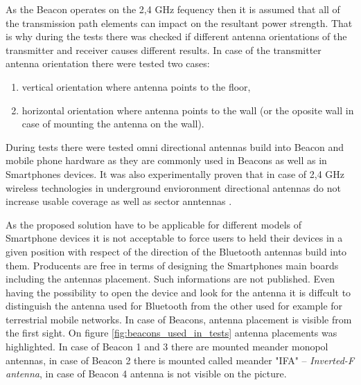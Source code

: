 \documentclass[../main.tex]{subfiles}
\begin{document}
As the Beacon operates on the 2,4 GHz fequency then it is assumed that all of the transmission path elements can impact on the resultant power strength. That is why during the tests there was checked if different antenna orientations of the transmitter and  receiver causes different results. In case of the transmitter antenna orientation there were tested two cases:
\begin{enumerate}
	\item vertical orientation where antenna points to the floor,
	\item horizontal orientation where antenna points to the wall (or the oposite wall in case of mounting the antenna on the wall).
\end{enumerate}

During tests there were tested omni directional antennas build into Beacon and mobile phone hardware as they are commonly used in Beacons as well as in Smartphones devices. It was also experimentally proven that in case of 2,4 GHz wireless technologies in underground envioronment directional antennas do not increase usable coverage as well as sector anntennas \cite{Thesis_CM}.

As the proposed solution have to be applicable for different models of Smartphone devices it is not acceptable to force users to held their devices in a given position with respect of the direction of the Bluetooth antennas build into them. Producents are free in terms of designing the Smartphones main boards including the antennas placement. Such informations are not published. Even having the possibility to open the device and look for the antenna it is diffcult to distinguish the antenna used for Bluetooth from the other used for example for terrestrial mobile networks. In case of Beacons, antenna placement is visible from the first sight. On figure \ref{fig:beacons_used_in_tests} antenna placements was highlighted. In case of Beacon 1 and 3 there are mounted meander monopol antennas, in case of Beacon 2 there is mounted called meander "IFA" -- \textit{Inverted-F antenna}, in case of Beacon 4 antenna is not visible on the picture.
\end{document}
